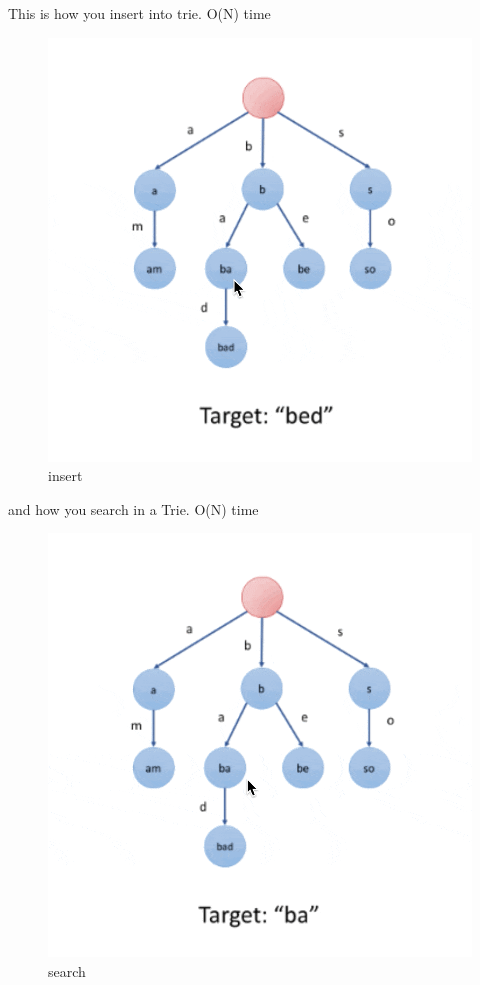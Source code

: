 \documentclass[11pt]{article}
\begin{document}
    This is how you insert into trie. O(N) time

    \begin{figure}
\centering
\includegraphics{../static/insert-trie.gif}
\caption{insert}
\end{figure}

    and how you search in a Trie. O(N) time

    \begin{figure}
\centering
\includegraphics{../static/search-trie.gif}
\caption{search}
\end{figure}
\end{document}
